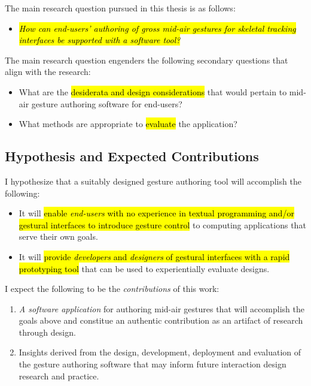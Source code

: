 The main research question pursued in this thesis is as follows:

\begin{itemize}
\item \hl{\emph{How can end-users' authoring of gross mid-air gestures for skeletal tracking interfaces be supported with a software tool?}}
\end{itemize}

The main research question engenders the following secondary questions that align with the research:

\begin{itemize}
\item What are the \hl{desiderata and design considerations} that would pertain to mid-air gesture authoring software for end-users?
\item What methods are appropriate to \hl{evaluate} the application?
\end{itemize}

\subsection{Hypothesis and Expected Contributions}

I hypothesize that a suitably designed gesture authoring tool will accomplish the following:

\begin{itemize}
\item It will \hl{enable \emph{end-users} with no experience in textual programming and/or gestural interfaces to introduce gesture control} to computing applications that serve their own goals.
\item It will \hl{provide \emph{developers} and \emph{designers} of gestural interfaces with a rapid prototyping tool} that can be used to experientially evaluate designs.
\end{itemize}

I expect the following to be the \emph{contributions} of this work:

\begin{enumerate}
\item \emph{A software application} for authoring mid-air gestures that will accomplish the goals above and constitue an authentic contribution as an artifact of research through design.
\item Insights derived from the design, development, deployment and evaluation of the gesture authoring software that may inform future interaction design research and practice.
\end{enumerate}

